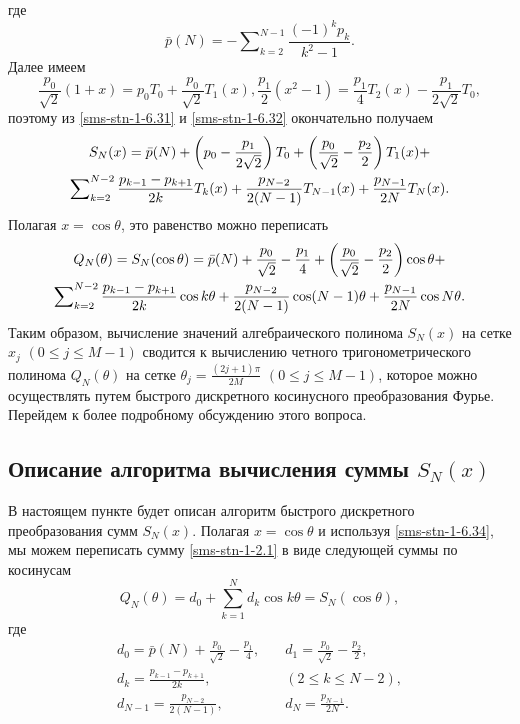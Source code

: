 где
\begin{equation}\label{sms-stn-1-6.32}
\bar p(N)= -\sum\nolimits_{k=2}^{N-1} \frac{(-1)^kp_k}{k^2-1}.
\end{equation}
Далее имеем
$$
\frac{p_0}{\sqrt{2}}(1+x)=p_0T_0+\frac{p_0}{\sqrt{2}}T_1(x), \frac{p_1}2(x^2-1)= \frac{p_1}4T_2(x) -\frac{p_1}{2\sqrt{2}}T_0,
$$
поэтому из \eqref{sms-stn-1-6.31} и  \eqref{sms-stn-1-6.32} окончательно получаем
\begin{multline}\label{sms-stn-1-6.33}
S_N(x)=\bar p(N)+\left(p_0-\frac{p_1}{2\sqrt{2}}\right)T_0+\left(\frac{p_0}{\sqrt{2}}-{p_{2}\over2}\right)T_1(x)+
\\
\sum\nolimits_{k=2}^{N-2}{p_{k-1}-p_{k+1}\over2k}T_k(x)
+{p_{N-2}\over2(N-1)}T_{N-1}(x)+{p_{N-1}\over2N}T_{N}(x).
\end{multline}
Полагая $x=\cos\theta$, это равенство можно переписать
\begin{multline}\label{sms-stn-1-6.34}
Q_N(\theta)=S_N(\cos\theta)=
\bar p(N)+\frac{p_0}{\sqrt{2}}-\frac{p_1}{4}+\left(\frac{p_0}{\sqrt{2}}-{p_{2}\over2}\right)\cos\theta+
\\
\sum\nolimits_{k=2}^{N-2}{p_{k-1}-p_{k+1}\over2k}\cos k\theta
+{p_{N-2}\over2(N-1)}\cos(N-1)\theta+{p_{N-1}\over2N}\cos N\theta.
\end{multline}
Таким образом, вычисление значений алгебраического полинома $S_N(x)$ на сетке $x_j$ $(0\le j\le M-1)$ сводится к вычислению
четного тригонометрического полинома $Q_N(\theta)$ на сетке $\theta_j=\frac{(2j+1)\pi}{2M}$ $(0\le j\le M-1)$, которое можно осуществлять путем быстрого
дискретного косинусного преобразования Фурье. Перейдем к более подробному обсуждению этого вопроса.

\subsection{Описание алгоритма вычисления суммы $S_N(x)$}

В настоящем пункте будет описан алгоритм быстрого дискретного преобразования сумм $S_N(x)$.
Полагая $x=\cos\theta$ и используя \eqref{sms-stn-1-6.34}, мы можем переписать сумму \eqref{sms-stn-1-2.1} в виде следующей суммы по косинусам
\begin{equation}\label{sms-stn-1-sobcheb12}
Q_N(\theta) =
d_{0} + \sum_{k=1}^{N}  d_{k} \cos{k\theta}=S_N(\cos\theta),
\end{equation}
где
\begin{align}
d_{0} =
\bar p(N) + \frac{ p_{0}}{\sqrt{2} }-\frac{ p_{1}}{4},
&\quad
d_{1} =
\frac{ p_{0}}{\sqrt{2}}-\frac{ p_{2}}{2},\label{sms-stn-1-sobcheb13}
\\
d_{k} =
\frac{ p_{k-1}- p_{k+1}}{2k},
&\quad(2 \leq k \leq N-2),\label{sms-stn-1-sobcheb13.1}
\\
d_{N-1} =
\frac{ p_{N-2}}{2(N-1)},
&\quad
d_{N} =
\frac{ p_{N-1}}{2N}.\label{sms-stn-1-sobcheb13.2}
\end{align}

